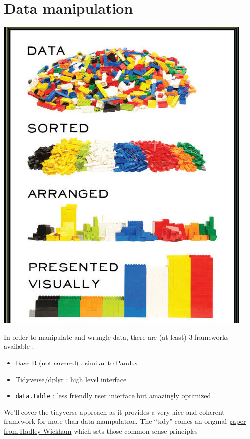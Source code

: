 \documentclass[
]{book}
\providecommand{\tightlist}{%
  \setlength{\itemsep}{0pt}\setlength{\parskip}{0pt}}
\begin{document}
\hypertarget{manip}{%
\chapter{Data manipulation}\label{manip}}

\includegraphics{img/data-viz.jpg}

In order to manipulate and wrangle data, there are (at least) 3 frameworks available :

\begin{itemize}
\tightlist
\item
  Base R (not covered) : similar to Pandas
\item
  Tidyverse/dplyr : high level interface
\item
  \texttt{data.table} : less friendly user interface but amazingly optimized
\end{itemize}

We'll cover the tidyverse approach as it provides a very nice and coherent framework for more than data manipulation. The ``tidy'' comes an original \href{http://www.jstatsoft.org/v59/i10/paper}{paper from Hadley Wickham} which sets those common sense principles
\end{document}
